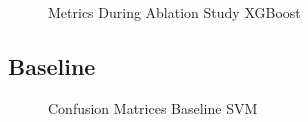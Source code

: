 \begin{figure}[!ht]
\centering
  \caption{Metrics During Ablation Study XGBoost}
  \label{fig:metrics_xgb_training}
\end{figure}




\FloatBarrier
\subsection{Baseline}

\begin{figure}[!ht]
\centering
  \caption{Confusion Matrices Baseline SVM}
  \label{fig:base_line_svm}
\end{figure}


